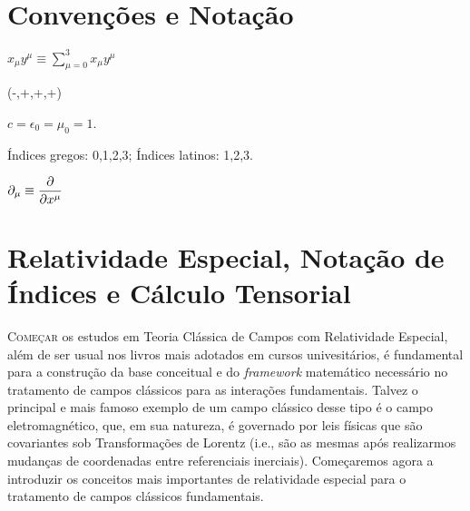 \documentclass[12pt,a4paper]{article}
\begin{document}
\newpage

\section*{Convenções e Notação}


\begin{description}[
    font=\bfseries,       %
    style=unboxed,          %
    leftmargin=4.5cm,       %
    labelsep=1cm            %
]
    \item[Soma de Einstein] \hspace{0.2cm}$\displaystyle x_{\mu}y^{\mu} \equiv \sum_{\mu=0}^{3}x_{\mu}y^{\mu}$
    
    \item[Assinatura] \hspace{1.6cm}(-,+,+,+)
    
    \item[Unidades Naturais] $c = \epsilon_0 = \mu_0 = 1$.
    
    \item[Índices] \hspace{2.4cm}Índices gregos: 0,1,2,3; Índices latinos: 1,2,3.
    \item[Derivadas Parciais] $\displaystyle \partial_{\mu} \equiv \pdv{}{x^{\mu}}$ 
  \end{description}

\newpage

\tableofcontents %
\newpage %

\section{Relatividade Especial, Notação de Índices e Cálculo Tensorial}

\lettrine[lines=3, nindent=0.1em]{\capitular{}C}{omeçar} os estudos
em Teoria Clássica de Campos com Relatividade Especial, além de ser usual nos livros mais adotados
em cursos univesitários, é fundamental para a construção da base conceitual e do \textit{framework}
matemático necessário no tratamento de campos clássicos para as interações fundamentais.
Talvez o principal e mais famoso exemplo de um campo clássico desse tipo é o campo eletromagnético, que,
em sua natureza, é governado por leis físicas que são covariantes sob Transformações de Lorentz
(i.e., são as mesmas após realizarmos mudanças de coordenadas entre referenciais inerciais).
Começaremos agora a introduzir os conceitos mais importantes de relatividade especial para o tratamento de
campos clássicos fundamentais.
\end{document}
